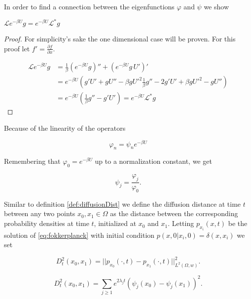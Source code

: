 In order to find a connection between the eigenfunctions $\varphi$ and $\psi$ we show
\begin{lemma}
$\mathcal{L}e^{-\beta U}g = e^{-\beta U}\mathcal{L}^*g$
\end{lemma}

\begin{proof}
For simplicity's sake the one dimensional case will be proven. For this proof let $f' = \frac{\partial f}{\partial x}$.

\begin{equation*}\begin{aligned}
\mathcal{L}e^{-\beta U}g &= \frac{1}{\beta}(e^{-\beta U}g)'' + \left(e^{-\beta U}g\,U' \right)'\\
&= e^{-\beta U}\left(g'U'+gU''-\beta gU'^2\frac{1}{\beta}g''-2g'U'+\beta gU'^2-gU'' \right)\\
&= e^{-\beta U}\left(\frac{1}{\beta}g'' - g'U'\right) = e^{-\beta U}\mathcal{L}^*g
\end{aligned}\end{equation*}
\end{proof}

Because of the linearity of the operators

\begin{equation*}
\varphi_n = \psi_n e^{-\beta U}
\end{equation*}

Remembering that $\varphi_0 = e^{-\beta U}$ up to a normalization constant, we get

\begin{equation}\label{eq:connectionBetweenEigenfunctions}
\psi_j = \frac{\varphi_j}{\varphi_0}.
\end{equation}

Similar to definition \ref{def:diffusionDist} we define the diffusion distance at time $t$ between any two points $x_0, x_1 \in \Omega$ as the distance between the corresponding probability densities at time $t$, initialized at $x_0$ and $x_1$. Letting $p_{x_i}(x,t)$ be the solution of \eqref{eq:fokkerplanck} with initial condition $p(x,0 | x_i, 0) = \delta(x,x_i)$ we set

\begin{definition}
\begin{equation*}
D_t^2(x_0,x_1) = ||p_{x_0}(\cdot, t) - p_{x_1}(\cdot, t) ||_{L^2(\Omega, w)}^2.
\end{equation*}
\end{definition}

\begin{lemma}\begin{equation*}
D_t^2(x_0,x_1) = \sum_{j\geq 1} e^{2\lambda_j t} (\psi_j(x_0)-\psi_j(x_1))^2.
\end{equation*}\end{lemma}

